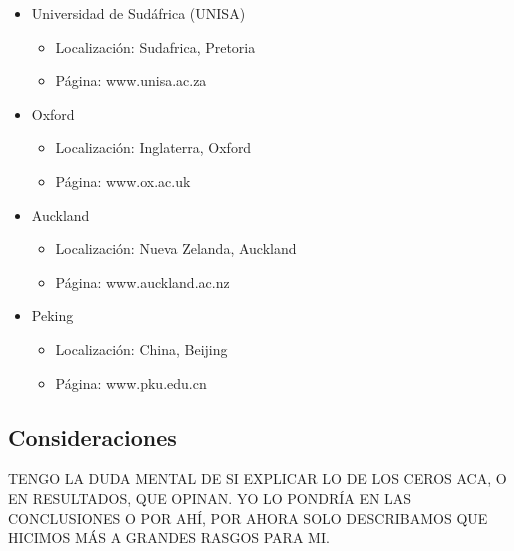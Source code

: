 \begin{itemize}
	\item Universidad de Sudáfrica (UNISA)
	
	\begin{itemize}
		\item Localización: Sudafrica, Pretoria
		\item Página: www.unisa.ac.za
	\end{itemize}
		 
	\item Oxford
	
	\begin{itemize}
		\item Localización: Inglaterra, Oxford 
		\item Página: www.ox.ac.uk
	\end{itemize}

	\item Auckland
	 
	\begin{itemize}
		\item Localización: Nueva Zelanda, Auckland 
		\item Página: www.auckland.ac.nz
	\end{itemize}

	\item Peking
	 
	\begin{itemize}
		\item Localización: China, Beijing 
		\item Página: www.pku.edu.cn
	\end{itemize}

\end{itemize}


\subsection{Consideraciones}

TENGO LA DUDA MENTAL DE SI EXPLICAR LO DE LOS CEROS ACA, O EN RESULTADOS, QUE OPINAN. 
YO LO PONDRÍA EN LAS CONCLUSIONES O POR AHÍ, POR AHORA SOLO DESCRIBAMOS QUE HICIMOS MÁS A GRANDES RASGOS PARA MI.
